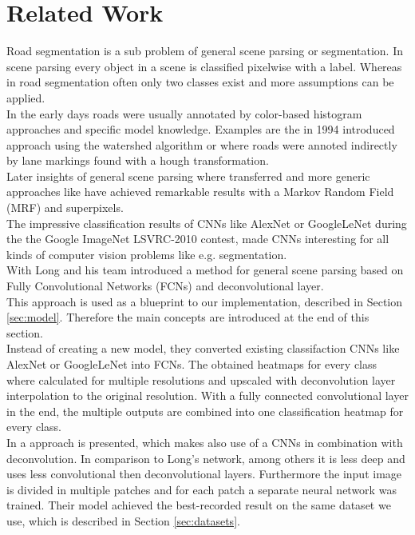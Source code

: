 
\section{Related Work}\label{sec:related-work}
Road segmentation is a sub problem of general scene parsing or segmentation. In scene parsing every object in a scene is classified pixelwise with a label. Whereas in road segmentation often only two classes exist and more assumptions can be applied.\\
In the early days roads were usually annotated by color-based histogram approaches and specific model knowledge. Examples are the in 1994 introduced approach \cite{Beucher1990} using the watershed algorithm or \cite{aly2008real} where roads were annoted indirectly by lane markings found with a hough transformation.\\
Later insights of general scene parsing where transferred and more generic approaches like \cite{6182716} have achieved remarkable results with a Markov Random Field (MRF) and superpixels.\\
The impressive classification results of CNNs like AlexNet \cite{krizhevsky2012imagenet} or GoogleLeNet \cite{SzegedyLJSRAEVR14} during the the Google ImageNet LSVRC-2010 contest, made CNNs interesting for all kinds of computer vision problems like e.g. segmentation. \\
With \cite{long2014fully} Long and his team introduced a method for general scene parsing based on Fully Convolutional Networks (FCNs) and deconvolutional layer.\\
This approach is used as a blueprint to our implementation, described in Section \ref{sec:model}. Therefore the main concepts are introduced at the end of this section.\\
Instead of creating a new model, they converted existing classifaction CNNs like AlexNet or GoogleLeNet into FCNs. The obtained heatmaps for every class where calculated for multiple resolutions and upscaled with deconvolution layer interpolation to the original resolution.
With a fully connected convolutional layer in the end, the multiple outputs are combined into one classification heatmap for every class.\\

In \cite{mohan2014deep} a approach is presented, which makes also use of a CNNs in combination with deconvolution. In comparison to Long's network, among others it is less deep and uses less convolutional then deconvolutional layers. Furthermore the input image is divided in multiple patches and for each patch a separate neural network was trained. Their model achieved the best-recorded result on the same dataset we use, which is described in Section \ref{sec:datasets}.    

